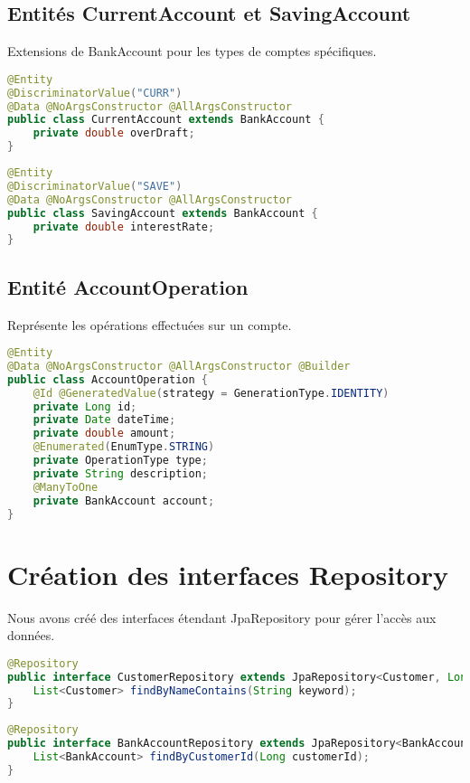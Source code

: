 \documentclass[12pt,a4paper]{report}
\begin{document}
\subsection{Entités CurrentAccount et SavingAccount}
Extensions de BankAccount pour les types de comptes spécifiques.

\begin{lstlisting}[language=Java, caption=CurrentAccount.java]
@Entity
@DiscriminatorValue("CURR")
@Data @NoArgsConstructor @AllArgsConstructor
public class CurrentAccount extends BankAccount {
    private double overDraft;
}
\end{lstlisting}

\begin{lstlisting}[language=Java, caption=SavingAccount.java]
@Entity
@DiscriminatorValue("SAVE")
@Data @NoArgsConstructor @AllArgsConstructor
public class SavingAccount extends BankAccount {
    private double interestRate;
}
\end{lstlisting}

\subsection{Entité AccountOperation}
Représente les opérations effectuées sur un compte.

\begin{lstlisting}[language=Java, caption=AccountOperation.java]
@Entity
@Data @NoArgsConstructor @AllArgsConstructor @Builder
public class AccountOperation {
    @Id @GeneratedValue(strategy = GenerationType.IDENTITY)
    private Long id;
    private Date dateTime;
    private double amount;
    @Enumerated(EnumType.STRING)
    private OperationType type;
    private String description;
    @ManyToOne
    private BankAccount account;
}
\end{lstlisting}

\section{Création des interfaces Repository}
Nous avons créé des interfaces étendant JpaRepository pour gérer l'accès aux données.

\begin{lstlisting}[language=Java, caption=CustomerRepository.java]
@Repository
public interface CustomerRepository extends JpaRepository<Customer, Long> {
    List<Customer> findByNameContains(String keyword);
}
\end{lstlisting}

\begin{lstlisting}[language=Java, caption=BankAccountRepository.java]
@Repository
public interface BankAccountRepository extends JpaRepository<BankAccount, String> {
    List<BankAccount> findByCustomerId(Long customerId);
}
\end{lstlisting}
\end{document}
